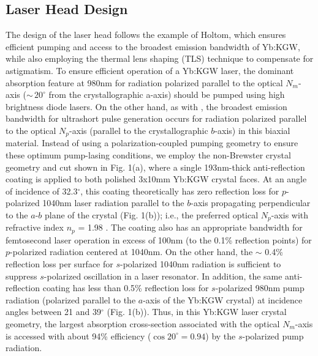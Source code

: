 \subsection{Laser Head Design}

The design of the laser head follows the example of Holtom\cite{Holtom_mode_locked_2006}, which ensures efficient pumping and access to the broadest emission bandwidth of Yb:KGW, while also employing the thermal lens shaping (TLS) technique to compensate for astigmatism\cite{Rimington_thermal_lens_2004}.
To ensure efficient operation of a Yb:KGW laser, the dominant absorption feature at 980nm for radiation polarized parallel to the optical $N_m$-axis ($\sim\,20^\circ$ from the crystallographic a-axis) should be pumped using high brightness diode lasers.
On the other hand, as with  \cite{Liu_diode_pumped_2001,Killi_high_peak_2005}, the broadest emission bandwidth for ultrashort pulse generation occurs for radiation polarized parallel to the optical $N_p$-axis (parallel to the crystallographic $b$-axis\cite{Holtom_mode_locked_2006}) in this biaxial material. 
Instead of using a polarization-coupled pumping geometry\cite{Holtom_mode_locked_2006} to ensure these optimum pump-lasing conditions, we employ the non-Brewster crystal geometry and cut shown in Fig. 1(a), where a single 193nm-thick  anti-reflection coating is applied to both polished 3x10mm Yb:KGW crystal faces.
At an angle of incidence of 32.3$^\circ$, this coating theoretically has zero reflection loss for $p$-polarized 1040nm laser radiation parallel to the $b$-axis propagating perpendicular to the $a$-$b$ plane of the crystal (Fig. 1(b)); i.e., the preferred optical $N_p$-axis with refractive index $n_p$ = 1.98 \cite{Biswal_thermo_optical_05,pujol_crystalline_1999}.
The  coating also has an appropriate bandwidth for femtosecond laser operation in excess of 100nm (to the
0.1\% reflection points) for $p$-polarized radiation centered at 1040nm.
On the other hand, the $\sim$ 0.4\% reflection loss per surface for $s$-polarized 1040nm radiation is sufficient to suppress $s$-polarized oscillation in a laser resonator.
In addition, the same anti-reflection coating has less than 0.5\% reflection loss for $s$-polarized 980nm pump radiation (polarized parallel to the $a$-axis of the Yb:KGW crystal) at incidence angles between 21 and 39$^\circ$ (Fig. 1(b)).
Thus, in this Yb:KGW laser crystal geometry, the largest absorption cross-section associated with the optical $N_m$-axis is accessed with about 94\% efficiency ($\cos 20^\circ = 0.94$) by the $s$-polarized pump radiation.

